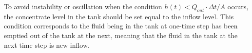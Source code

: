To avoid instability or oscillation when the condition $h(t) < Q_{out}\cdot \Delta t / A$ occurs, the concentrate level in the tank should be set equal to the inflow level. This condition corresponds to the fluid being in the tank at one-time step has been emptied out of the tank at the next, meaning that the fluid in the tank at the next time step is new inflow.  



